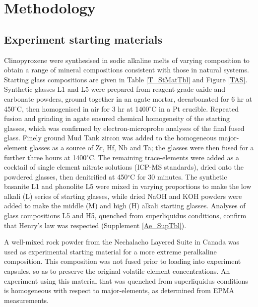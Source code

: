 \documentclass[review,authoryear,12pt]{elsarticle}
\newcommand{\dgC}{$^\circ$C }
\newcommand{\dgCs}{$^\circ$C}
\begin{document}

\section{Methodology}

\subsection{Experiment starting materials}
Clinopyroxene were synthesised in sodic alkaline melts of varying composition to obtain a range of mineral compositions consistent with those in natural systems. Starting glass compositions are given in Table \ref{T_StMatTbl} and Figure \ref{TAS}. Synthetic glasses L1 and L5 were prepared from reagent-grade oxide and carbonate powders, ground together in an agate mortar, decarbonated for 6 hr at 450\dgCs, then homogenised in air for 3 hr at 1400\dgC in a Pt crucible. Repeated fusion and grinding in agate ensured chemical homogeneity of the starting glasses, which was confirmed by electron-microprobe analyses of the final fused glass. Finely ground Mud Tank zircon was added to the homogeneous major-element glasses as a source of Zr, Hf, Nb and Ta; the glasses were then fused for a further three hours at 1400\dgCs. The remaining trace-elements were added as a cocktail of single element nitrate solutions (ICP-MS standards), dried onto the powdered glasses, then denitrified at 450\dgC for 30 minutes. The synthetic basanite L1 and phonolite L5 were mixed in varying proportions to make the low alkali (L) series of starting glasses, while dried NaOH and KOH powders were added to make the middle (M) and high (H) alkali starting glasses. Analyses of glass compositions L5 and H5, quenched from superliquidus conditions, confirm that Henry's law was respected (Supplement \ref{Ae_SupTbl}).

A well-mixed rock powder from the Nechalacho Layered Suite in Canada \citep[][Unit NLS-9, sample L09-194-405.5, alternative sample name \emph{VM 11-6}]{Moller2016} was used as experimental starting material for a more extreme peralkaline composition. This composition was not fused prior to loading into experiment capsules, so as to preserve the original volatile element concentrations. An experiment using this material that was quenched from superliquidus conditions is homogeneous with respect to major-elements, as determined from EPMA measurements.
\end{document}
